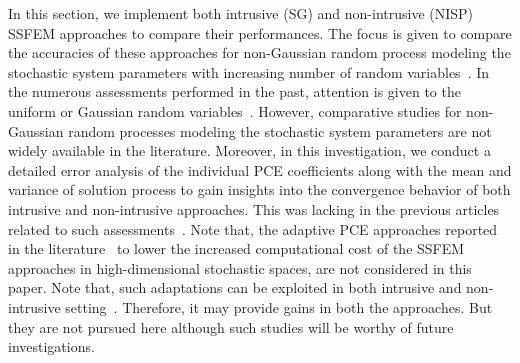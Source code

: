 \documentclass[letter,1p,11pt,oneside,onecolumn,sort&compress]{elsarticle}
\begin{document}
In this section, we implement both intrusive (SG) and non-intrusive (NISP) SSFEM approaches to compare their performances. The focus is given to compare the accuracies of these approaches for non-Gaussian random process modeling the stochastic system parameters with increasing number of random variables~\cite{ghanem1999nonlinear,ghanem1999stochastic}.
In the numerous assessments performed in the past, attention is given to the uniform or Gaussian random variables~\cite{elman2011assessment,back2011stochastic,desai2010analysis}. However, comparative studies for non-Gaussian random processes modeling the stochastic system parameters are not widely available in the literature.
Moreover, in this investigation, we conduct a detailed error analysis of the individual PCE coefficients along with the mean and variance of solution process to gain insights into the convergence behavior of both intrusive and non-intrusive approaches. This was lacking in the previous articles related to such assessments~\cite{elman2011assessment,tipireddy2010comparison,desai2010analysis}.
Note that, the adaptive PCE approaches reported in the literature~\cite{li1998adaptive,lucor2004adaptive,wan2005adaptive,nobile2008sparse} to lower the increased computational cost of the SSFEM approaches in high-dimensional stochastic spaces, are not considered in this paper. Note that, such adaptations can be exploited in both intrusive and non-intrusive setting~\cite{li1998adaptive,lucor2004adaptive,wan2005adaptive,nobile2008sparse}. Therefore, it may provide gains in both the approaches.
But they are not pursued here although such studies will be worthy of future investigations.
\end{document}
